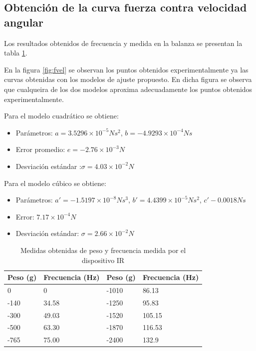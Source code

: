 \documentclass[main]{subfiles}
\begin{document}
\subsection{Obtenci\'on de la curva fuerza contra velocidad angular}

Los resultados obtenidos de frecuencia y medida en la balanza se presentan la tabla \ref{tab:fuerza-vel}.


En la figura \ref{fig:fvel} se observan los puntos obtenidos experimentalmente ya las curvas obtenidas con los modelos de ajuste propuesto. En dicha figura se observa que cualqueira de los dos modelos aproxima adecuadamente los puntos obtenidos experimentalmente.


Para el modelo cuadr\'atico se obtiene:
\begin{itemize}
\item Par\'ametros: $a=3.5296\times10^{-5}Ns^2$, $b=-4.9293\times 10^{-4}Ns$
\item Error promedio: $e=-2.76\times 10 ^{-3}N$
\item Desviaci\'on est\'andar :$\sigma=4.03\times10^{-2}N$
\end{itemize}

Para el modelo c\'ubico se obtiene:
\begin{itemize}
\item Par\'ametros: $a\prime = -1.5197\times 10^{-8}Ns^3$, $b\prime =4.4399\times10^{-5}Ns^2$, $c\prime -0.0018Ns$
\item Error: $7.17\times10^{-4}N$
\item Desviaci\'on est\'andar: $\sigma=2.66\times 10^{-2}N$
\end{itemize}

\begin{table}[H]
\centering
\begin{tabular}{|p{80pt}|p{80pt}||p{80pt}|p{80pt}|} 
 \cellcolor[gray]{0.8} \textbf{Peso (g)} & \cellcolor[gray]{0.8} \textbf{Frecuencia (Hz)} & \cellcolor[gray]{0.8} \textbf{Peso (g)} & \cellcolor[gray]{0.8} \textbf{Frecuencia (Hz)}\\ \hline
 
 0  & 0     & -1010 & 86.13\\ \hline

-140 & 34.58   &  -1250  & 95.83  \\ \hline

 -300  & 49.03   & -1520 & 105.15\\ \hline

-500 & 63.30 & -1870  & 116.53 \\ \hline

-765  & 75.00  & -2400 & 132.9\\ \hline


\end{tabular}
\caption{Medidas obtenidas de peso y frecuencia medida por el dispositivo IR}
\label{tab:fuerza-vel}
\end{table}
\end{document}
